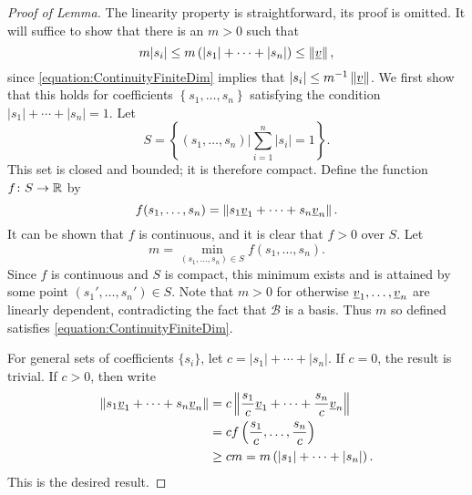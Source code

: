 \begin{proof}[Proof of Lemma]
The linearity property is straightforward, its proof is omitted.
It will suffice to show that there is an $m > 0$ such that
\begin{equation} \label{equation:ContinuityFiniteDim}
m |s_i| \leq m \left( |s_1| + \cdots + |s_n| \right) \leq \left\| \underline{v} \right\| ,
\end{equation}
since \eqref{equation:ContinuityFiniteDim} implies that $|s_i| \leq m^{-1} \left\| \underline{v} \right\|$.
We first show that this holds for coefficients $\left\{ s_1, \ldots, s_n \right\}$ satisfying the condition $|s_1| + \cdots + |s_n| = 1$.
Let
\begin{equation*}
S = \left\{ (s_1, \ldots, s_n) \Big| \sum_{i=1}^n |s_i| = 1 \right\}.
\end{equation*}
This set is closed and bounded; it is therefore compact.
Define the function $f \colon S \rightarrow \mathbb{R}$ by
\begin{equation*}
f(s_1, \ldots, s_n) = \left\| s_1 \underline{v}_1 + \cdots + s_n \underline{v}_n \right\| .
\end{equation*}
It can be shown that $f$ is continuous, and it is clear that $f > 0$ over $S$.
Let
\begin{equation*}
m = \min_{(s_1, \ldots, s_n) \in S} f(s_1, \ldots, s_n) .
\end{equation*}
Since $f$ is continuous and $S$ is compact, this minimum exists and is attained by some point $(s_1', \ldots, s_n') \in S$.
Note that $m > 0$ for otherwise $\underline{v}_1, \ldots, \underline{v}_n$ are linearly dependent, contradicting the fact that $\mathcal{B}$ is a basis.
Thus $m$ so defined satisfies \eqref{equation:ContinuityFiniteDim}.

For general sets of coefficients $\{ s_i \}$, let $c = |s_1| + \cdots + |s_n|$.
If $c = 0$, the result is trivial.
If $c > 0$, then write
\begin{equation*}
\begin{split}
\left\| s_1 \underline{v}_1 + \cdots + s_n \underline{v}_n \right\|
&= c \left\| \frac{s_1}{c} \underline{v}_1 + \cdots + \frac{s_n}{c} \underline{v}_n \right\| \\
&= c f \left( \frac{s_1}{c}, \ldots, \frac{s_n}{c} \right) \\
&\geq c m = m \left( |s_1| + \cdots + |s_n| \right) .
\end{split}
\end{equation*}
This is the desired result.
\end{proof}

